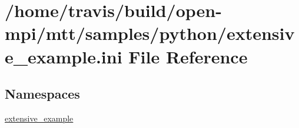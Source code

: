 \hypertarget{extensive__example_8ini}{\section{/home/travis/build/open-\/mpi/mtt/samples/python/extensive\-\_\-example.ini File Reference}
\label{extensive__example_8ini}
}
\subsection*{Namespaces}
\begin{DoxyCompactItemize}
\item 
\hyperlink{namespaceextensive__example}{extensive\-\_\-example}
\end{DoxyCompactItemize}
